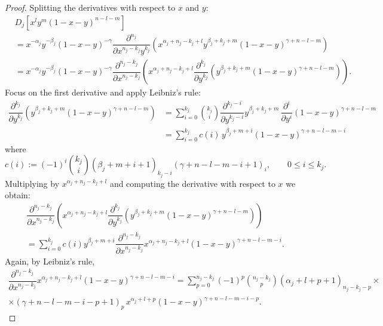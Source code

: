 \documentclass[10pt,a4paper]{amsart}
\begin{document}
\begin{proof}
    Splitting the derivatives with respect to $x$ and $y$:
    $$
    \begin{aligned}
        &D_j[x^l y^m(1-x-y)^{n-l-m}]\\ &= x^{-\alpha_j}y^{-\beta_j}(1-x-y)^{-\gamma}\dfrac{\partial^{n_j}}{\partial x^{n_j-k_j}y^{k_j}}\left( x^{\alpha_j+n_j-k_j+l} y^{\beta_j+k_j+m} (1-x-y)^{\gamma+n-l-m}\right) \\ & =
    x^{-\alpha_j}y^{-\beta_j}(1-x-y)^{-\gamma}\dfrac{\partial^{n_j-k_j}}{\partial x^{n_j-k_j}}\left(x^{\alpha_j+n_j-k_j+l}\dfrac{\partial^{k_j}}{\partial y^{k_j}} (y^{\beta_j+k_j+m} (1-x-y)^{\gamma+n-l-m})\right).
    \end{aligned}
    $$
    Focus on the first derivative and apply Leibniz's rule:
    \begin{equation}
        \begin{aligned}
            \dfrac{\partial^{k_j}}{\partial y^{k_j}} (y^{\beta_j+k_j+m} (1-x-y)^{\gamma+n-l-m}) &= \sum_{i=0}^{k_j}\binom{k_j}{i} \dfrac{\partial^{k_j-i}}{\partial y^{k_j-i}}y^{\beta_j+k_j+m} \, \dfrac{\partial^{i}}{\partial y^{i}}(1-x-y)^{\gamma+n-l-m} \\ &=\sum_{i=0}^{k_j}c(i)\, y^{\beta_j+m+i}(1-x-y)^{\gamma+n-l-m-i}
        \end{aligned}
    \end{equation}
    where 
    \begin{equation}
        \label{eq:coef-c-1}
        c(i):=(-1)^i\binom{k_j}{i}(\beta_j+m+i+1)_{k_j-i}(\gamma+n-l-m-i+1)_i, \qquad 0\leq i\leq k_j.
    \end{equation}
    Multiplying by $x^{\alpha_j+n_j-k_j+l}$ and computing the derivative with respect to $x$ we obtain:
    \begin{multline*}
        \dfrac{\partial^{n_j-k_j}}{\partial x^{n_j-k_j}}\left(x^{\alpha_j+n_j-k_j+l}\dfrac{\partial^{k_j}}{\partial y^{k_j}} (y^{\beta_j+k_j+m} (1-x-y)^{\gamma+n-l-m})\right) \\ =\sum_{i=0}^{k_j}c(i)  y^{\beta_j+m+i}\dfrac{\partial^{n_j-k_j}}{\partial x^{n_j-k_j}}x^{\alpha_j+n_j-k_j+l}(1-x-y)^{\gamma+n-l-m-i}.
    \end{multline*}
    Again, by Leibniz's rule,
    \begin{multline*}
        \dfrac{\partial^{n_j-k_j}}{\partial x^{n_j-k_j}}x^{\alpha_j+n_j-k_j+l}(1-x-y)^{\gamma+n-l-m-i}=\sum_{p=0}^{n_j-k_j}(-1)^p\binom{n_j-k_j}{p}(\alpha_j+l+p+1)_{n_j-k_j-p}\times \\ \times (\gamma+n-l-m-i-p+1)_{p}\, x^{\alpha_j+l+p}(1-x-y)^{\gamma+n-l-m-i-p}.

\end{multline*}
\end{proof}
\end{document}
